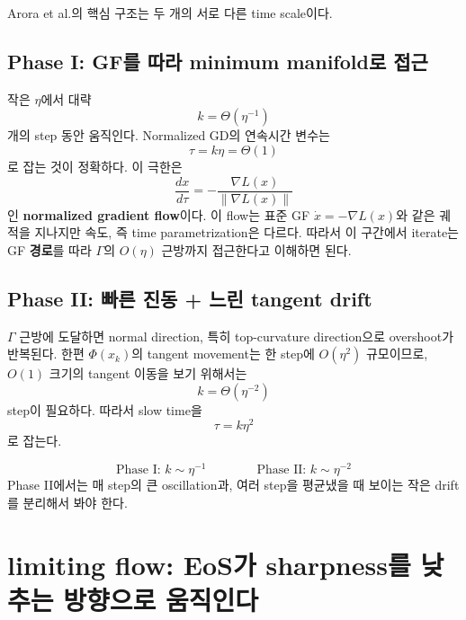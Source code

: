 \documentclass[11pt,a4paper,oneside,openany]{memoir}
\newcommand{\grad}{\nabla}
\newcommand{\norm}[1]{\left\lVert #1\right\rVert}
\theoremstyle{definition}
\begin{document}
Arora et al.의 핵심 구조는 두 개의 서로 다른 time scale이다.

\subsection{Phase I: GF를 따라 minimum manifold로 접근}

작은 $\eta$에서 대략
\begin{equation}
  k=\Theta(\eta^{-1})
\end{equation}
개의 step 동안 움직인다. Normalized GD의 연속시간 변수는
\begin{equation}
  \tau=k\eta=\Theta(1)
\end{equation}
로 잡는 것이 정확하다. 이 극한은
\begin{equation}
  \frac{dx}{d\tau}=-\frac{\grad L(x)}{\norm{\grad L(x)}}
\end{equation}
인 \textbf{normalized gradient flow}이다. 이 flow는 표준 GF
$\dot x=-\grad L(x)$와 같은 궤적을 지나지만 속도, 즉 time parametrization은 다르다.
따라서 이 구간에서 iterate는 GF \textbf{경로}를 따라 $\Gamma$의 $O(\eta)$ 근방까지 접근한다고 이해하면 된다.

\subsection{Phase II: 빠른 진동 + 느린 tangent drift}

$\Gamma$ 근방에 도달하면 normal direction, 특히 top-curvature direction으로 overshoot가 반복된다.
한편 $\Phi(x_k)$의 tangent movement는 한 step에 $O(\eta^2)$ 규모이므로,
$O(1)$ 크기의 tangent 이동을 보기 위해서는
\begin{equation}
  k=\Theta(\eta^{-2})
\end{equation}
step이 필요하다. 따라서 slow time을
\begin{equation}
  \tau=k\eta^2
\end{equation}
로 잡는다.

\begin{keybox}
\[
\boxed{\text{Phase I: } k\sim\eta^{-1}}
\qquad\qquad
\boxed{\text{Phase II: } k\sim\eta^{-2}}
\]
Phase II에서는 매 step의 큰 oscillation과, 여러 step을 평균냈을 때 보이는 작은 drift를 분리해서 봐야 한다.
\end{keybox}

\section{limiting flow: EoS가 sharpness를 낮추는 방향으로 움직인다}
\end{document}
